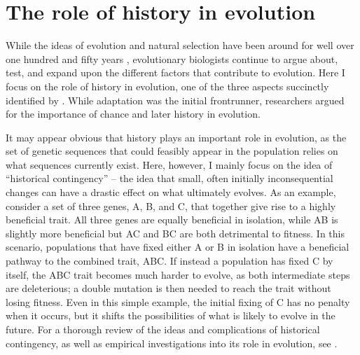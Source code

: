 \section{The role of history in evolution}

While the ideas of evolution and natural selection have been around for well over one hundred and fifty years \citep{darwin1859}, evolutionary biologists continue to argue about, test, and expand upon the different factors that contribute to evolution. 
Here I focus on the role of history in evolution, one of the three aspects succinctly identified by \citet{travisanoExperimentalTestsRoles1995}. 
While adaptation was the initial frontrunner, researchers argued for the importance of chance %
\citep{kimuraEvolutionaryRateMolecular1968, king1969non, mayrHowCarryOut1983} and later history \citep{gouldSpandrelsSanMarco1979, gouldWonderfulLifeBurgess1990} in evolution. 

It may appear obvious that history plays an important role in evolution, as the set of genetic sequences that could feasibly appear in the population relies on what sequences currently exist.
Here, however, I mainly focus on the idea of ``historical contingency'' -- the idea that small, often initially inconsequential changes can have a drastic effect on what ultimately evolves. 
As an example, consider a set of three genes, A, B, and C, that together give rise to a highly beneficial trait. 
All three genes are equally beneficial in isolation, while AB is slightly more beneficial but AC and BC are both detrimental to fitness. 
In this scenario, populations that have fixed either A or B in isolation have a beneficial pathway to the combined trait, ABC. 
If instead a population has fixed C by itself, the ABC trait becomes much harder to evolve, as both intermediate steps are deleterious; a double mutation is then needed to reach the trait without losing fitness. 
Even in this simple example, the initial fixing of C has no penalty when it occurs, but it shifts the possibilities of what is likely to evolve in the future. 
For a thorough review of the ideas and complications of historical contingency, as well as empirical investigations into its role in evolution, see \citep{blountContingencyDeterminismEvolution2018}.

